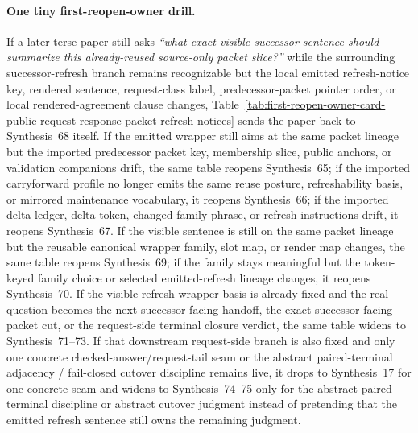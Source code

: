 \documentclass[11pt]{article}
\begin{document}
\paragraph{One tiny first-reopen-owner drill.}
If a later terse paper still asks \emph{``what exact visible successor sentence should summarize this already-reused source-only packet slice?''} while the surrounding successor-refresh branch remains recognizable but the local emitted refresh-notice key, rendered sentence, request-class label, predecessor-packet pointer order, or local rendered-agreement clause changes, Table~\ref{tab:first-reopen-owner-card-public-request-response-packet-refresh-notices} sends the paper back to Synthesis~68 itself. If the emitted wrapper still aims at the same packet lineage but the imported predecessor packet key, membership slice, public anchors, or validation companions drift, the same table reopens Synthesis~65; if the imported carryforward profile no longer emits the same reuse posture, refreshability basis, or mirrored maintenance vocabulary, it reopens Synthesis~66; if the imported delta ledger, delta token, changed-family phrase, or refresh instructions drift, it reopens Synthesis~67. If the visible sentence is still on the same packet lineage but the reusable canonical wrapper family, slot map, or render map changes, the same table reopens Synthesis~69; if the family stays meaningful but the token-keyed family choice or selected emitted-refresh lineage changes, it reopens Synthesis~70. If the visible refresh wrapper basis is already fixed and the real question becomes the next successor-facing handoff, the exact successor-facing packet cut, or the request-side terminal closure verdict, the same table widens to Synthesis~71--73. If that downstream request-side branch is also fixed and only one concrete checked-answer/request-tail seam or the abstract paired-terminal adjacency / fail-closed cutover discipline remains live, it drops to Synthesis~17 for one concrete seam and widens to Synthesis~74--75 only for the abstract paired-terminal discipline or abstract cutover judgment instead of pretending that the emitted refresh sentence still owns the remaining judgment.\cite{series:publicrequestresponsepackets,series:publicrequestresponsepacketcarryforward,series:publicrequestresponsepacketdeltas,series:publicrequestresponsepacketrefreshnoticenormalforms,series:publicrequestresponsepacketrefreshnoticeselections,series:publicrequestresponsepacketrefreshresponsemenus,series:publicrequestresponsepacketrefreshresponsepackets,series:publicrequestresponsepacketrefreshresponsepacketclosureverdicts,series:pairedterminalcitationdiscipline,series:pairedterminalcutoverrule}
\end{document}
